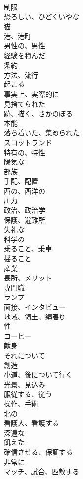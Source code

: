 \documentclass[8pt]{extreport}
\begin{document}
\begin{CJK}{UTF8}{min}
\\	制限
\\	恐ろしい、ひどくいやな
\\	猫
\\	港、港町
\\	男性の、男性
\\	経験を積んだ
\\	条約
\\	方法、流行
\\	起こる
\\	事実上、実際的に
\\	見捨てられた
\\	跡、描く、さかのぼる
\\	本能
\\	落ち着いた、集められた
\\	スコットランド
\\	特有の、特性
\\	陽気な
\\	部族
\\	手配、配置
\\	西の、西洋の
\\	圧力
\\	政治、政治学
\\	保護、避難所
\\	失礼な
\\	科学の
\\	乗ること、乗車
\\	揺ること
\\	産業
\\	長所、メリット
\\	専門職
\\	ランプ
\\	面接、インタビュー
\\	地域、領土、縄張り
\\	性
\\	コーヒー
\\	献身
\\	それについて
\\	創造
\\	小道、後について行く
\\	光景、見込み
\\	服従する、従う
\\	操作、手術
\\	北の
\\	看護人、看護する
\\	深遠な
\\	飢えた
\\	確信させる、保証する
\\	非常に
\\	マッチ、試合、匹敵する

\end{CJK}
\end{document}

